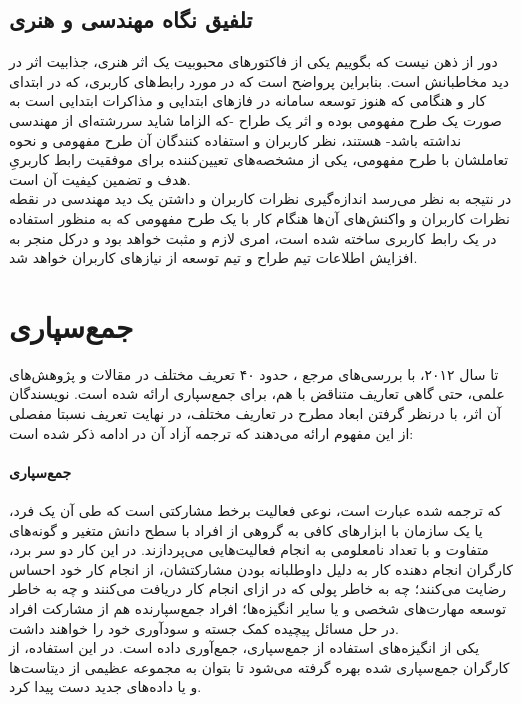 \subsection{تلفیق نگاه مهندسی و هنری}
دور از ذهن نیست که بگوییم یکی از فاکتورهای محبوبیت یک اثر هنری، جذابیت اثر در دید مخاطبانش است. بنابراین پرواضح است که در مورد رابط‌های کاربری، که در ابتدای کار و هنگامی که هنوز توسعه سامانه در فازهای ابتدایی و مذاکرات ابتدایی است به صورت یک طرح مفهومی بوده و اثر یک طراح -که الزاما شاید سررشته‌ای از مهندسی نداشته باشد- هستند، نظر کاربران و استفاده کنندگان آن طرح مفهومی و نحوه تعاملشان با طرح مفهومی، یکی از مشخصه‌های تعیین‌کننده برای موفقیت رابط کاربریِ هدف و تضمین کیفیت آن است.\\
در نتیجه به نظر می‌رسد اندازه‌گیری نظرات کاربران و داشتن یک دید مهندسی در نقطه نظرات کاربران و واکنش‌های آن‌ها هنگام کار با یک طرح مفهومی که به منظور استفاده در یک رابط کاربری ساخته شده است، امری لازم و مثبت خواهد بود و درکل منجر به افزایش اطلاعات تیم طراح و تیم توسعه از نیازهای کاربران خواهد شد.
\section{جمع‌سپاری}
تا سال ۲۰۱۲، با بررسی‌های مرجع 
\cite{estelles-arolas_towards_2012}،
حدود ۴۰ تعریف مختلف در مقالات و پژوهش‌های علمی، حتی گاهی تعاریف متناقض با هم، برای جمع‌سپاری ارائه شده است. نویسندگان آن اثر، با درنظر گرفتن ابعاد مطرح در تعاریف مختلف، در نهایت تعریف نسبتا مفصلی از این مفهوم ارائه می‌دهند که ترجمه آزاد آن در ادامه ذکر شده است: 
\paragraph{جمع‌سپاری}
که ترجمه شده عبارت
است، نوعی فعالیت برخط
مشارکتی است که طی آن یک فرد، یا یک سازمان با ابزارهای کافی به گروهی از افراد با سطح دانش متغیر و گونه‌های متفاوت و با تعداد نامعلومی به انجام فعالیت‌هایی می‌پردازند. در این کار دو سر برد، کارگران انجام دهنده کار
به دلیل داوطلبانه بودن مشارکتشان، از انجام کار خود احساس رضایت می‌کنند؛ چه به خاطر پولی که در ازای انجام کار دریافت می‌کنند و چه به خاطر توسعه مهارت‌های شخصی و یا سایر انگیزه‌ها؛ افراد جمع‌سپارنده هم از مشارکت افراد در حل مسائل پیچیده کمک جسته و سودآوری خود را خواهند داشت. \\
یکی از انگیزه‌های استفاده از جمع‌سپاری، جمع‌آوری داده
است. در این استفاده، از کارگران جمع‌سپاری شده بهره گرفته می‌شود تا بتوان به مجموعه عظیمی از دیتاست‌ها و یا داده‌های جدید دست پیدا کرد.
